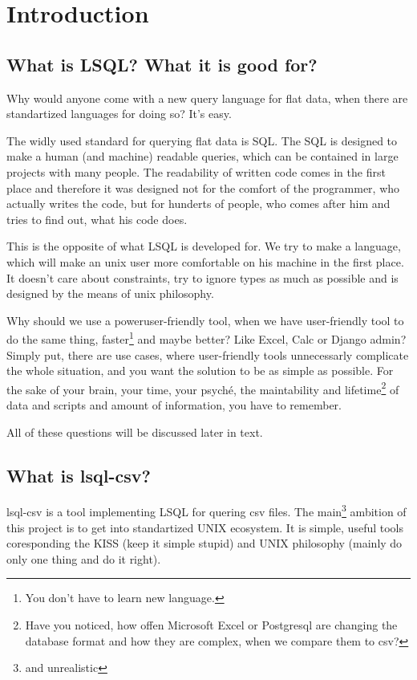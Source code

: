 \chapter{Introduction}

\section{What is LSQL? What it is good for?}

Why would anyone come with a new query language for flat data, when there are standartized languages for doing so? It's easy.

The widly used standard for querying flat data is SQL. The SQL is designed to make a human (and machine) readable queries, which can be contained in large projects with many people.
The readability of written code comes in the first place and therefore it was designed not for the comfort of the programmer, who actually writes the code, but for hunderts of people, who comes after him and tries to find out, what his code does.

This is the opposite of what LSQL is developed for. We try to make a language, which will make an unix user more comfortable on his machine in the first place. It doesn't care about constraints, try to ignore types as much as possible and is designed by the means of unix philosophy.

Why should we use a poweruser-friendly tool, when we have user-friendly tool to do the same thing, faster\footnote{You don't have to learn new language.} and maybe better? Like Excel, Calc or Django admin?
Simply put, there are use cases, where user-friendly tools unnecessarly complicate the whole situation, and you want the solution to be as simple as possible. For the sake of your brain, your time, your psyché, the maintability and lifetime\footnote{Have you noticed, how offen Microsoft Excel or Postgresql are changing the database format and how they are complex, when we compare them to csv?} of data and scripts and amount of information, you have to remember.

All of these questions will be discussed later in text.

\section{What is lsql-csv?}
lsql-csv is a tool implementing LSQL for quering csv files. The main\footnote{and unrealistic} ambition of this project is to get into standartized UNIX ecosystem. It is simple, useful tools coresponding the KISS (keep it simple stupid) and UNIX philosophy (mainly do only one thing and do it right).

